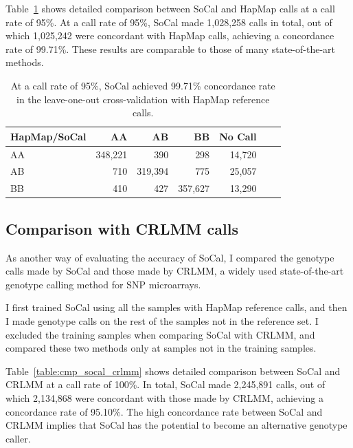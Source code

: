 \documentclass{scrartcl}
\begin{document}
\par
Table~\ref{table:cmp_hapmap_socal_95} shows detailed comparison between
SoCal and HapMap calls at a call rate of 95\%.
At a call rate of 95\%, SoCal made 1,028,258 calls in total, out of which
1,025,242 were concordant with HapMap calls, achieving a concordance
rate of 99.71\%.
These results are comparable to those of many state-of-the-art methods.

\begin{table}[H]
\centering
\begin{tabular}{l*{5}{r}r}
    \hline
    HapMap/SoCal  & AA       & AB      & BB      & No Call \\ \hline
    AA            & 348,221  & 390     & 298     & 14,720  \\
    AB            & 710      & 319,394 & 775     & 25,057  \\
    BB            & 410      & 427     & 357,627 & 13,290  \\ \hline
\end{tabular}
\caption{At a call rate of 95\%, SoCal achieved 99.71\% concordance rate
in the leave-one-out cross-validation with HapMap reference calls.}
\label{table:cmp_hapmap_socal_95}
\end{table}

\subsection{Comparison with CRLMM calls}

\par
As another way of evaluating the accuracy of SoCal, I compared the genotype
calls made by SoCal and those made by CRLMM, a widely used state-of-the-art
genotype calling method for SNP microarrays.

\par
I first trained SoCal using all the samples with HapMap reference calls, and
then I made genotype calls on the rest of the samples not in the reference set.
I excluded the training samples when comparing SoCal with CRLMM, and compared
these two methods only at samples not in the training samples.

\par
Table~\ref{table:cmp_socal_crlmm} shows detailed comparison between SoCal
and CRLMM at a call rate of 100\%.
In total, SoCal made 2,245,891 calls, out of which 2,134,868 were concordant
with those made by CRLMM, achieving a concordance rate of 95.10\%.
The high concordance rate between SoCal and CRLMM implies that SoCal has the
potential to become an alternative genotype caller.
\end{document}
